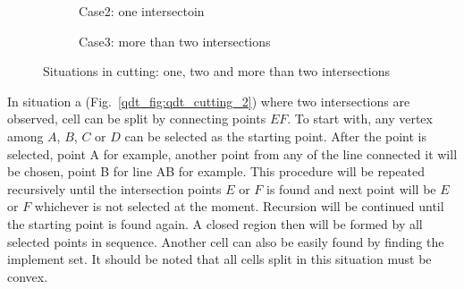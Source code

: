 \begin{figure}[h!]
\begin{subfigure}[b]{0.3\linewidth}
{        }
        \label{qdt_fig:qdt_cutting_1}
        \caption{Case2: one intersectoin}
    \end{subfigure}
    \begin{subfigure}[b]{0.3\linewidth}
        \caption{Case3: more than two intersections}
        \label{qdt_fig:qdt_cutting_3}
    \end{subfigure}
    \caption[Situations in cutting]{Situations in cutting: one, two and more than two intersections}
    \label{qdt_fig:qdt_cutting}
\end{figure}
In situation a (Fig.~\ref{qdt_fig:qdt_cutting_2}) where two intersections are observed, cell can be split by connecting points $EF$.
To start with, any vertex among $A$, $B$, $C$ or $D$ can be selected as the starting point.
After the point is selected, point A for example, another point from any of the line connected it will be chosen, point B for line AB for example.
This procedure will be repeated recursively until the intersection points $E$ or $F$ is found and next point will be $E$ or $F$ whichever is not selected at the moment.
Recursion will be continued until the starting point is found again.
A closed region then will be formed by all selected points in sequence.
Another cell can also be easily found by finding the implement set.
It should be noted that all cells split in this situation must be convex.

